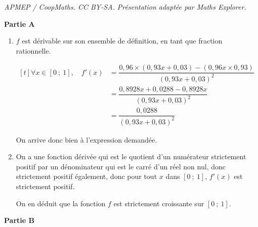 \documentclass[10pt]{article}
\begin{document}
\noindent\textit{APMEP / CoopMaths. CC BY-SA. Présentation adaptée par Maths Explorer.}\par\medskip
\medskip

\textbf{Partie A}

\smallskip

\begin{enumerate}
	\item $f$ est dérivable sur son ensemble de définition, en tant que fraction rationnelle.

$\begin{aligned}[t] \forall x \in [0~;~1],\quad f'(x) &= \dfrac{0,96 \times (0,93 x + 0,03) - (0,96x \times 0,93)}{(0,93x + 0,03)^2}\\
&=\dfrac{0,8928 x + 0,0288 - 0,8928 x}{(0,93x + 0,03)^2}\\
&=\dfrac{0,0288}{(0,93x + 0,03)^2}\end{aligned}$

On arrive donc bien à l'expression demandée.

	\item On a une fonction dérivée qui est le quotient d'un numérateur strictement positif par un dénominateur qui est le carré d'un réel non nul, donc strictement positif également, donc pour tout $x$ dans $ [0~;~1] $, $f'(x)$ est strictement positif.

On en déduit que la fonction $f$ est strictement croissante sur $ [0~;~1] $.
	\end{enumerate}

	\bigskip

	\textbf{Partie B}

	\smallskip
\end{document}
